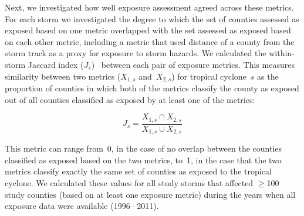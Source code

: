 Next, we investigated how well exposure assessment agreed across 
these metrics. For each storm we investigated the degree to which the 
set of counties assessed as exposed based on one metric overlapped with the set
assessed as exposed based on each other metric, including a metric that used
distance of a county from the storm track as a proxy for exposure to storm hazards. 
We calculated the within-storm
Jaccard index ($J_s$)~\parencite{jaccard1901distribution, jaccard1908nouvelles} between
each pair of exposure metrics. This measures similarity
between two metrics ($X_{1,s}$ and~$X_{2,s}$) for tropical cyclone~$s$ as the
proportion of counties in which both of the metrics classify the county as
exposed out of all counties classified as exposed by at least one of the
metrics:

\begin{equation} 
J_s = \frac{X_{1,s} \cap X_{2,s}}{X_{1,s} \cup X_{2,s}}
\end{equation}

\noindent This metric can range from~0, in the case of no overlap between the
counties classified as exposed based on the two metrics, to~1, in the case that
the two metrics classify exactly the same set of counties as exposed to the
tropical cyclone. We calculated these values for all study storms that affected
$\ge$100 study counties (based on at least one exposure metric) during the
years when all exposure data were available (1996\,--\,2011).


